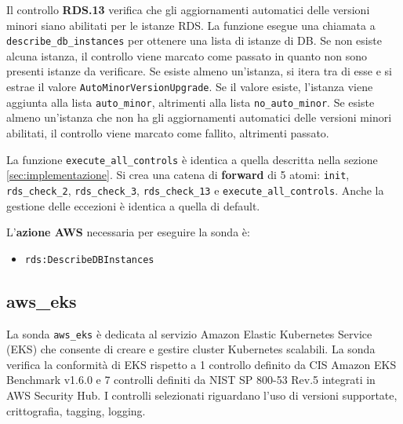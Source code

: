 Il controllo \textbf{RDS.13} verifica che gli aggiornamenti automatici delle versioni minori siano abilitati per le istanze RDS. La funzione esegue una chiamata a \texttt{describe\_db\_instances} per ottenere una lista di istanze di DB. Se non esiste alcuna istanza, il controllo viene marcato come passato in quanto non sono presenti istanze da verificare. Se esiste almeno un'istanza, si itera tra di esse e si estrae il valore \texttt{AutoMinorVersionUpgrade}. Se il valore esiste, l'istanza viene aggiunta alla lista \texttt{auto\_minor}, altrimenti alla lista \texttt{no\_auto\_minor}. Se esiste almeno un'istanza che non ha gli aggiornamenti automatici delle versioni minori abilitati, il controllo viene marcato come fallito, altrimenti passato.

La funzione \texttt{execute\_all\_controls} è identica a quella descritta nella sezione \ref{sec:implementazione}. Si crea una catena di \textbf{forward} di 5 atomi: \texttt{init}, \texttt{rds\_check\_2}, \texttt{rds\_check\_3}, \texttt{rds\_check\_13} e \texttt{execute\_all\_controls}. Anche la gestione delle eccezioni è identica a quella di default.

L'\textbf{azione AWS} necessaria per eseguire la sonda è:
\begin{itemize}
    \item \texttt{rds:DescribeDBInstances}
\end{itemize}

\subsection{aws\_eks}
\label{sec:eks}

La sonda \texttt{aws\_eks} è dedicata al servizio Amazon Elastic Kubernetes Service (EKS) che consente di creare e gestire cluster Kubernetes scalabili. La sonda verifica la conformità di EKS rispetto a 1 controllo definito da CIS Amazon EKS Benchmark v1.6.0 e 7 controlli definiti da NIST SP 800-53 Rev.5 integrati in AWS Security Hub. I controlli selezionati riguardano l'uso di versioni supportate, crittografia, tagging, logging.

